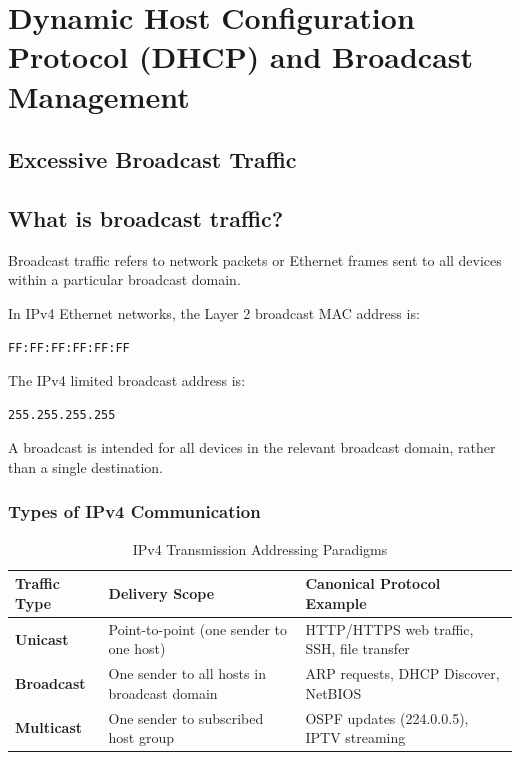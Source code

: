 \section{Dynamic Host Configuration Protocol (DHCP) and Broadcast Management}

\subsection{Excessive Broadcast Traffic}

\subsection{What is broadcast traffic?}

Broadcast traffic refers to network packets or Ethernet frames sent to all devices within a particular broadcast domain.

In IPv4 Ethernet networks, the Layer 2 broadcast MAC address is:

\begin{lstlisting}
FF:FF:FF:FF:FF:FF
\end{lstlisting}

The IPv4 limited broadcast address is:

\begin{lstlisting}
255.255.255.255
\end{lstlisting}

A broadcast is intended for all devices in the relevant broadcast domain, rather than a single destination.

\subsubsection{Types of IPv4 Communication}
\begin{table}[htbp]
\centering
\caption{IPv4 Transmission Addressing Paradigms}
\label{tab:ipv4_transmission_paradigms}
\begin{tabularx}{\textwidth}{p{2.8cm} p{4.2cm} X}
\toprule
\textbf{Traffic Type} & \textbf{Delivery Scope} & \textbf{Canonical Protocol Example} \\
\midrule
\textbf{Unicast} & Point-to-point (one sender to one host) & HTTP/HTTPS web traffic, SSH, file transfer \\
\textbf{Broadcast} & One sender to all hosts in broadcast domain & ARP requests, DHCP Discover, NetBIOS \\
\textbf{Multicast} & One sender to subscribed host group & OSPF updates (224.0.0.5), IPTV streaming \\
\bottomrule
\end{tabularx}
\end{table}


